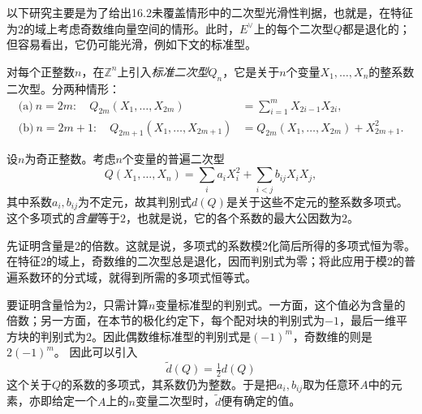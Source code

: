 \begingroup
\def\newscope{V-Q}
\def\OO{\mathcal O}
\def\Sym{\operatorname{Sym}}
以下研究主要是为了给出16.2未覆盖情形中的二次型光滑性判据，也就是，在特征为$2$的域上考虑奇数维向量空间的情形。此时，$E^\vee$上的每个二次型$Q$都是退化的；但容易看出，它仍可能光滑，例如下文的标准型。

对每个正整数$n$，在$\mathbb Z^n$上引入\emph{标准二次型}$Q_n$，它是关于$n$个变量$X_1,\ldots,X_n$的整系数二次型。分两种情形：
\begin{align*}
\text{(a)}\ n=2m:\quad
Q_{2m}(X_1,\ldots,X_{2m})&=\sum_{i=1}^{m}X_{2i-1}X_{2i},\\
\text{(b)}\ n=2m+1:\quad
Q_{2m+1}(X_1,\ldots,X_{2m+1})&=Q_{2m}(X_1,\ldots,X_{2m})+X_{2m+1}^2 .
\end{align*}


设$n$为奇正整数。考虑$n$个变量的普遍二次型
\[
Q(X_1,\ldots,X_n)=\sum_i a_i X_i^2+\sum_{i<j}b_{ij}X_iX_j,
\]
其中系数$a_i,b_{ij}$为不定元，故其判别式$d(Q)$是关于这些不定元的整系数多项式。这个多项式的\emph{含量}等于$2$，也就是说，它的各个系数的最大公因数为$2$。

先证明含量是$2$的倍数。这就是说，多项式的系数模$2$化简后所得的多项式恒为零。在特征$2$的域上，奇数维的二次型总是退化，因而判别式为零；将此应用于模$2$的普遍系数环的分式域，就得到所需的多项式恒等式。

要证明含量恰为$2$，只需计算$n$变量标准型的判别式。一方面，这个值必为含量的倍数；另一方面，在本节的极化约定下，每个配对块的判别式为$-1$，最后一维平方块的判别式为$2$。因此偶数维标准型的判别式是$(-1)^m$，奇数维的则是$2(-1)^m$。 因此可以引入
\[
\widetilde d(Q)=\tfrac12 d(Q)
\]
这个关于$Q$的系数的多项式，其系数仍为整数。于是把$a_i,b_{ij}$取为任意环$A$中的元素，亦即给定一个$A$上的$n$变量二次型时，$\widetilde d$便有确定的值。

